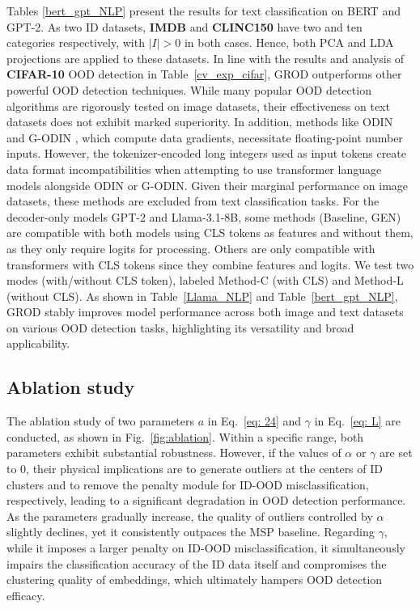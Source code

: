 \documentclass{article}
\theoremstyle{plain}
\theoremstyle{definition}
\theoremstyle{remark}
\begin{document}
Tables \ref{bert_gpt_NLP} present the results for text classification on BERT and GPT-2. As two ID datasets, \textbf{IMDB} and \textbf{CLINC150} have two and ten categories respectively, with $|I|>0$ in both cases. Hence, both PCA and LDA projections are applied to these datasets. In line with the results and analysis of \textbf{CIFAR-10} OOD detection in Table~\ref{cv_exp_cifar}, \textsc{GROD} outperforms other powerful OOD detection techniques.
%
While many popular OOD detection algorithms are rigorously tested on image datasets, their effectiveness on text datasets does not exhibit marked superiority. In addition, methods like \textsc{ODIN} \citep{liang2017enhancing} and \textsc{G-ODIN} \citep{hsu2020generalized}, which compute data gradients, necessitate floating-point number inputs. However, the tokenizer-encoded long integers used as input tokens create data format incompatibilities when attempting to use transformer language models alongside \textsc{ODIN} or \textsc{G-ODIN}. Given their marginal performance on image datasets, these methods are excluded from text classification tasks.
%
For the decoder-only models GPT-2 and Llama-3.1-8B, some methods (Baseline, \textsc{GEN}) are compatible with both models using CLS tokens as features and without them, as they only require logits for processing. Others are only compatible with transformers with CLS tokens since they combine features and logits. We test two modes (with/without CLS token), labeled Method-C (with CLS) and Method-L (without CLS). As shown in Table~\ref{Llama_NLP} and Table~\ref{bert_gpt_NLP}, \textsc{GROD} stably improves model performance across both image and text datasets on various OOD detection tasks, highlighting its versatility and broad applicability. 



\subsection{Ablation study} 
\label{ablation study}
The ablation study of two parameters $a$ in Eq.~\ref{eq: 24} and $\gamma$ in Eq.~\ref{eq: L} are conducted, as shown in Fig.~\ref{fig:ablation}. Within a specific range, both parameters exhibit substantial robustness. However, if the values of $\alpha$ or $\gamma$ are set to 0, their physical implications are to generate outliers at the centers of ID clusters and to remove the penalty module for ID-OOD misclassification, respectively, leading to a significant degradation in OOD detection performance. As the parameters gradually increase, the quality of outliers controlled by $\alpha$ slightly declines, yet it consistently outpaces the MSP baseline. Regarding $\gamma$, while it imposes a larger penalty on ID-OOD misclassification, it simultaneously impairs the classification accuracy of the ID data itself and compromises the clustering quality of embeddings, which ultimately hampers OOD detection efficacy.
\end{document}
